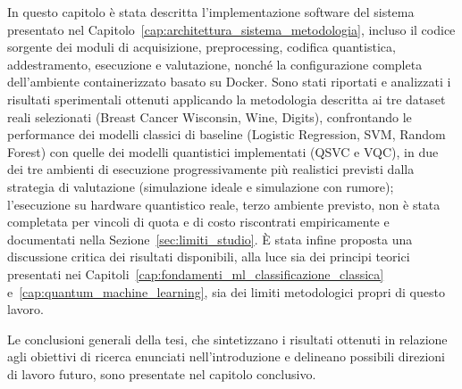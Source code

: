 In questo capitolo è stata descritta l'implementazione software del sistema presentato nel Capitolo~\ref{cap:architettura_sistema_metodologia}, incluso il codice sorgente dei moduli di acquisizione, preprocessing, codifica quantistica, addestramento, esecuzione e valutazione, nonché la configurazione completa dell'ambiente containerizzato basato su Docker. Sono stati riportati e analizzati i risultati sperimentali ottenuti applicando la metodologia descritta ai tre dataset reali selezionati (Breast Cancer Wisconsin, Wine, Digits), confrontando le performance dei modelli classici di baseline (Logistic Regression, SVM, Random Forest) con quelle dei modelli quantistici implementati (QSVC e VQC), in due dei tre ambienti di esecuzione progressivamente più realistici previsti dalla strategia di valutazione (simulazione ideale e simulazione con rumore); l'esecuzione su hardware quantistico reale, terzo ambiente previsto, non è stata completata per vincoli di quota e di costo riscontrati empiricamente e documentati nella Sezione~\ref{sec:limiti_studio}. È stata infine proposta una discussione critica dei risultati disponibili, alla luce sia dei principi teorici presentati nei Capitoli~\ref{cap:fondamenti_ml_classificazione_classica} e~\ref{cap:quantum_machine_learning}, sia dei limiti metodologici propri di questo lavoro.

Le conclusioni generali della tesi, che sintetizzano i risultati ottenuti in relazione agli obiettivi di ricerca enunciati nell'introduzione e delineano possibili direzioni di lavoro futuro, sono presentate nel capitolo conclusivo.
